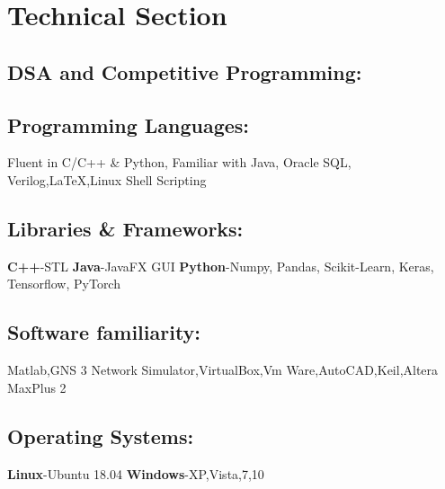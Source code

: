 \documentclass{article}
\begin{document}
\section*{Technical Section}

\subsection*{DSA and Competitive Programming:}

\subsection*{Programming Languages:}
Fluent in C/C++ \& Python, Familiar with Java, Oracle SQL, Verilog,{\LaTeX},Linux Shell Scripting

\subsection*{Libraries \& Frameworks:}
\textbf{C++}-STL
\textbf{Java}-JavaFX GUI
\textbf{Python}-Numpy, Pandas, Scikit-Learn, Keras, Tensorflow, PyTorch

\subsection*{Software familiarity:}
Matlab,GNS 3 Network Simulator,VirtualBox,Vm Ware,AutoCAD,Keil,Altera MaxPlus 2

\subsection*{Operating Systems:}
\textbf{ Linux}-Ubuntu 18.04
\textbf{ Windows}-XP,Vista,7,10
\end{document}
